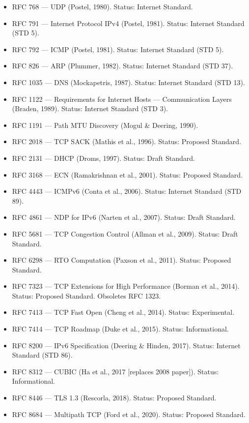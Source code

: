 \documentclass[11pt,letterpaper]{article}
\begin{document}
\begin{itemize}[noitemsep]
  \item RFC 768 --- UDP (Postel, 1980). Status: Internet Standard.
  \item RFC 791 --- Internet Protocol IPv4 (Postel, 1981). Status: Internet Standard (STD 5).
  \item RFC 792 --- ICMP (Postel, 1981). Status: Internet Standard (STD 5).
  \item RFC 826 --- ARP (Plummer, 1982). Status: Internet Standard (STD 37).
  \item RFC 1035 --- DNS (Mockapetris, 1987). Status: Internet Standard (STD 13).
  \item RFC 1122 --- Requirements for Internet Hosts --- Communication Layers (Braden, 1989). Status: Internet Standard (STD 3).
  \item RFC 1191 --- Path MTU Discovery (Mogul \& Deering, 1990).
  \item RFC 2018 --- TCP SACK (Mathis et al., 1996). Status: Proposed Standard.
  \item RFC 2131 --- DHCP (Droms, 1997). Status: Draft Standard.
  \item RFC 3168 --- ECN (Ramakrishnan et al., 2001). Status: Proposed Standard.
  \item RFC 4443 --- ICMPv6 (Conta et al., 2006). Status: Internet Standard (STD 89).
  \item RFC 4861 --- NDP for IPv6 (Narten et al., 2007). Status: Draft Standard.
  \item RFC 5681 --- TCP Congestion Control (Allman et al., 2009). Status: Draft Standard.
  \item RFC 6298 --- RTO Computation (Paxson et al., 2011). Status: Proposed Standard.
  \item RFC 7323 --- TCP Extensions for High Performance (Borman et al., 2014). Status: Proposed Standard. Obsoletes RFC 1323.
  \item RFC 7413 --- TCP Fast Open (Cheng et al., 2014). Status: Experimental.
  \item RFC 7414 --- TCP Roadmap (Duke et al., 2015). Status: Informational.
  \item RFC 8200 --- IPv6 Specification (Deering \& Hinden, 2017). Status: Internet Standard (STD 86).
  \item RFC 8312 --- CUBIC (Ha et al., 2017 [replaces 2008 paper]). Status: Informational.
  \item RFC 8446 --- TLS 1.3 (Rescorla, 2018). Status: Proposed Standard.
  \item RFC 8684 --- Multipath TCP (Ford et al., 2020). Status: Proposed Standard.

\end{itemize}
\end{document}
